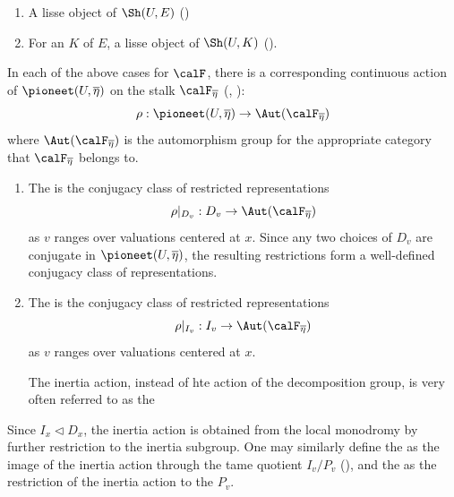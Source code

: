 \begin{definition}
\begin{enumerate}
\begin{enumerate}
            \item A lisse object of $\Sh(U,E)$ ()
            \item For an  $K$ of $E$, a lisse object of $\Sh(U,K)$ ().
        \end{enumerate}
    \end{enumerate}

    In each of the above cases for $\calF$, there is a corresponding continuous action of $\pioneet(U, \overline{\eta})$ on the stalk $\calF_{\overline{\eta}}$ (, ):
    $$\rho: \pioneet(U, \overline{\eta}) \to \Aut(\calF_{\overline{\eta}})$$
    where $\Aut(\calF_{\overline{\eta}})$ is the automorphism group for the appropriate category that $\calF_{\overline{\eta}}$ belongs to.

    \begin{enumerate}
        \item The  is the conjugacy class of restricted representations
        $$\rho|_{D_v}: D_v \to \Aut(\calF_{\overline{\eta}})$$
        as $v$ ranges over valuations centered at $x$. Since any two choices of $D_v$ are conjugate in $\pioneet(U, \overline{\eta})$, the resulting restrictions form a well-defined conjugacy class of representations.

        \item The  is the conjugacy class of restricted representations
        $$\rho|_{I_v}: I_v \to \Aut(\calF_{\overline{\eta}})$$
        as $v$ ranges over valuations centered at $x$.

        The inertia action, instead of hte action of the decomposition group, is very often referred to as the  
    \end{enumerate}
    Since $I_x \triangleleft D_x$, the inertia action is obtained from the local monodromy by further restriction to the inertia subgroup. One may similarly define the  as the image of the inertia action through the tame quotient $I_v / P_v$ (), and the  as the restriction of the inertia action to the  $P_v$.
\end{definition}
